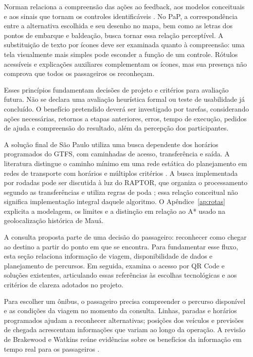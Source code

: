 \documentclass[12pt,oneside,a4paper,brazil,chapter=TITLE]{abntex2}
\begin{document}
Norman relaciona a compreensão das ações ao feedback, aos modelos conceituais e aos sinais que tornam os controles identificáveis \citep{norman2013}. No PaP, a correspondência entre a alternativa escolhida e seu desenho no mapa, bem como as letras dos pontos de embarque e baldeação, busca tornar essa relação perceptível. A substituição de texto por ícones deve ser examinada quanto à compreensão: uma tela visualmente mais simples pode esconder a função de um controle. Rótulos acessíveis e explicações auxiliares complementam os ícones, mas sua presença não comprova que todos os passageiros os reconheçam.

Esses princípios fundamentam decisões de projeto e critérios para avaliação futura. Não se declara uma avaliação heurística formal ou teste de usabilidade já concluído. O benefício pretendido deverá ser investigado por tarefas, considerando ações necessárias, retornos a etapas anteriores, erros, tempo de execução, pedidos de ajuda e compreensão do resultado, além da percepção dos participantes.

A solução final de São Paulo utiliza uma busca dependente dos horários programados do GTFS, com caminhadas de acesso, transferência e saída. A literatura distingue o caminho mínimo em uma rede estática do planejamento em redes de transporte com horários e múltiplos critérios \citep{dijkstra1959,bast2015}. A busca implementada por rodadas pode ser discutida à luz do RAPTOR, que organiza o processamento segundo as transferências e utiliza regras de poda \citep{delling2012}; essa relação conceitual não significa implementação integral daquele algoritmo. O Apêndice~\ref{ap:rotas} explicita a modelagem, os limites e a distinção em relação ao A* usado na geolocalização histórica de Mauá.

A consulta proposta parte de uma decisão do passageiro: reconhecer como chegar ao destino a partir do ponto em que se encontra. Para fundamentar esse fluxo, esta seção relaciona informação de viagem, disponibilidade de dados e planejamento de percursos. Em seguida, examina o acesso por QR Code e soluções existentes, articulando essas referências às escolhas tecnológicas e aos critérios de clareza adotados no projeto.

Para escolher um ônibus, o passageiro precisa compreender o percurso disponível e as condições da viagem no momento da consulta. Linhas, paradas e horários programados ajudam a reconhecer alternativas; posições dos veículos e previsões de chegada acrescentam informações que variam ao longo da operação. A revisão de Brakewood e Watkins reúne evidências sobre os benefícios da informação em tempo real para os passageiros \citep{brakewood2019}.
\end{document}
